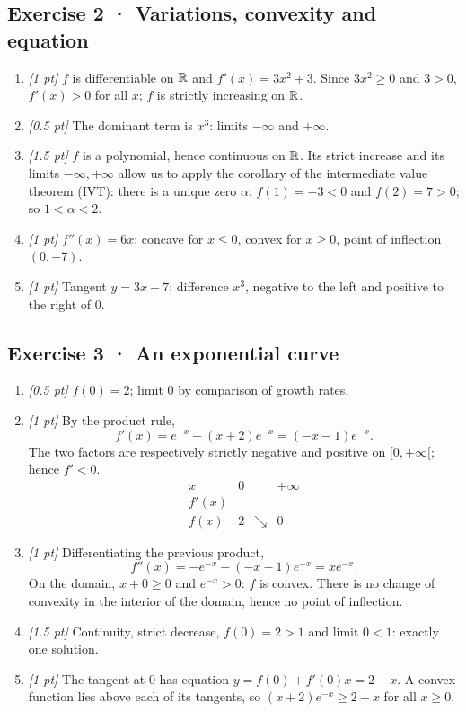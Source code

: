\subsection*{Exercise 2 · Variations, convexity and equation}\begin{enumerate}

\item \textit{[1 pt]} $f$ is differentiable on $\mathbb R$ and $f'(x)=3x^2+3$. Since $3x^2\ge0$ and $3>0$, $f'(x)>0$ for all $x$; $f$ is strictly increasing on $\mathbb R$.

\item \textit{[0.5 pt]} The dominant term is $x^3$: limits $-\infty$ and $+\infty$.

\item \textit{[1.5 pt]} $f$ is a polynomial, hence continuous on $\mathbb R$. Its strict increase and its limits $-\infty,+\infty$ allow us to apply the corollary of the intermediate value theorem (IVT): there is a unique zero $\alpha$. $f(1)=-3<0$ and $f(2)=7>0$; so $1<\alpha<2$.

\item \textit{[1 pt]} $f''(x)=6x$: concave for $x\le0$, convex for $x\ge0$, point of inflection $(0,-7)$.

\item \textit{[1 pt]} Tangent $y=3x-7$; difference $x^3$, negative to the left and positive to the right of $0$.

\end{enumerate}

\subsection*{Exercise 3 · An exponential curve}\begin{enumerate}

\item \textit{[0.5 pt]} $f(0)=2$; limit $0$ by comparison of growth rates.

\item \textit{[1 pt]} By the product rule,
\[f'(x)=e^{-x}-(x+2)e^{-x}=(-x-1)e^{-x}.\]
The two factors are respectively strictly negative and positive on $[0,+\infty[$; hence $f'<0$.
\[\begin{array}{c|ccc}x&0&&+\infty\\\hline f'(x)&&-&\\\hline f(x)&2&\searrow&0\end{array}\]

\item \textit{[1 pt]} Differentiating the previous product,
\[f''(x)=-e^{-x}-(-x-1)e^{-x}=xe^{-x}.\]
On the domain, $x+0\ge0$ and $e^{-x}>0$: $f$ is convex. There is no change of convexity in the interior of the domain, hence no point of inflection.

\item \textit{[1.5 pt]} Continuity, strict decrease, $f(0)=2>1$ and limit $0<1$: exactly one solution.

\item \textit{[1 pt]} The tangent at $0$ has equation $y=f(0)+f'(0)x=2-x$. A convex function lies above each of its tangents, so $(x+2)e^{-x}\ge 2-x$ for all $x\ge0$.

\end{enumerate}

